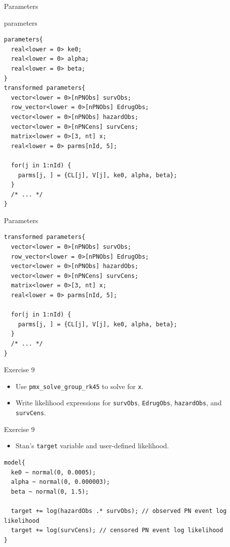 \documentclass[presentation, allowframebreaks]{beamer}
\begin{document}
\begin{frame}[fragile,label={sec:org3256d3e}]{Parameters}
 \begin{block}{parameters}
\begin{verbatim}
parameters{
  real<lower = 0> ke0;
  real<lower = 0> alpha;
  real<lower = 0> beta;
}
transformed parameters{
  vector<lower = 0>[nPNObs] survObs;
  row_vector<lower = 0>[nPNObs] EdrugObs;
  vector<lower = 0>[nPNObs] hazardObs;
  vector<lower = 0>[nPNCens] survCens;
  matrix<lower = 0>[3, nt] x;
  real<lower = 0> parms[nId, 5];

  for(j in 1:nId) {
    parms[j, ] = {CL[j], V[j], ke0, alpha, beta};
  }
  /* ... */
}
\end{verbatim}
\end{block}
\end{frame}
\begin{frame}[fragile,label={sec:orgab9dd2b}]{Parameters}
 \begin{verbatim}
transformed parameters{
  vector<lower = 0>[nPNObs] survObs;
  row_vector<lower = 0>[nPNObs] EdrugObs;
  vector<lower = 0>[nPNObs] hazardObs;
  vector<lower = 0>[nPNCens] survCens;
  matrix<lower = 0>[3, nt] x;
  real<lower = 0> parms[nId, 5];

  for(j in 1:nId) {
    parms[j, ] = {CL[j], V[j], ke0, alpha, beta};
  }
  /* ... */
}
\end{verbatim}
\begin{block}{Exercise 9}
\begin{itemize}
\item Use \texttt{pmx\_solve\_group\_rk45} to solve for \texttt{x}.
\item Write likelihood expressions for \texttt{survObs}, \texttt{EdrugObs}, \texttt{hazardObs}, and \texttt{survCens}.
\end{itemize}
\end{block}
\end{frame}

\begin{frame}[fragile,label={sec:org4c7a24e}]{Exercise 9}
 \begin{itemize}
\item Stan's \texttt{target} variable and user-defined likelihood.
\end{itemize}
\begin{verbatim}
model{
  ke0 ~ normal(0, 0.0005);
  alpha ~ normal(0, 0.000003);
  beta ~ normal(0, 1.5);

  target += log(hazardObs .* survObs); // observed PN event log likelihood
  target += log(survCens); // censored PN event log likelihood
}
\end{verbatim}
\end{frame}
\end{document}
